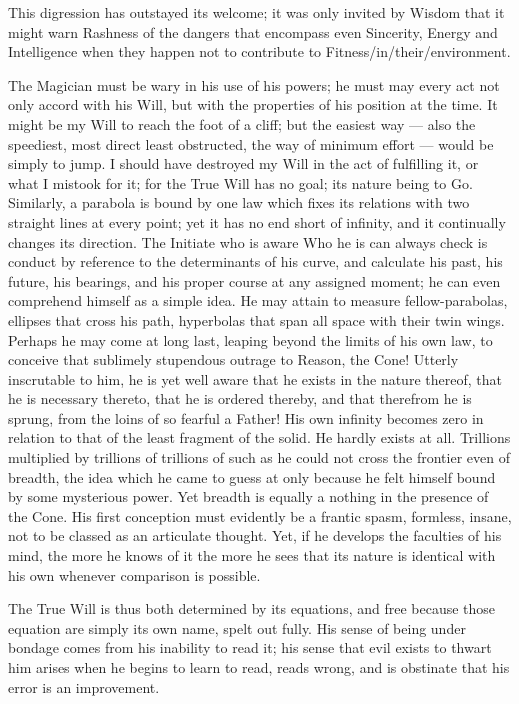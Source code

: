 This digression has outstayed its welcome; it was only invited by Wisdom that it might warn Rashness of the dangers that encompass even Sincerity, Energy and Intelligence when they happen not to contribute to Fitness\-/in\-/their\-/environment.

The Magician must be wary in his use of his powers; he must may every act not only accord with his Will, but with the properties of his position at the time. It might be my Will to reach the foot of a cliff; but the easiest way --- also the speediest, most direct least obstructed, the way of minimum effort --- would be simply to jump. I should have destroyed my Will in the act of fulfilling it, or what I mistook for it; for the True Will has no goal; its nature being to Go. Similarly, a parabola is bound by one law which fixes its relations with two straight lines at every point; yet it has no end short of infinity, and it continually changes its direction. The Initiate who is aware Who he is can always check is conduct by reference to the determinants of his curve, and calculate his past, his future, his bearings, and his proper course at any assigned moment; he can even comprehend himself as a simple idea. He may attain to measure fellow-parabolas, ellipses that cross his path, hyperbolas that span all space with their twin wings. Perhaps he may come at long last, leaping beyond the limits of his own law, to conceive that sublimely stupendous outrage to Reason, the Cone! Utterly inscrutable to him, he is yet well aware that he exists in the nature thereof, that he is necessary thereto, that he is ordered thereby, and that therefrom he is sprung, from the loins of so fearful a Father! His own infinity becomes zero in relation to that of the least fragment of the solid. He hardly exists at all. Trillions multiplied by trillions of trillions of such as he could not cross the frontier even of breadth, the idea which he came to guess at only because he felt himself bound by some mysterious power. Yet breadth is equally a nothing in the presence of the Cone. His first conception must evidently be a frantic spasm, formless, insane, not to be classed as an articulate thought. Yet, if he develops the faculties of his mind, the more he knows of it the more he sees that its nature is identical with his own whenever comparison is possible.

The True Will is thus both determined by its equations, and free because those equation are simply its own name, spelt out fully. His sense of being under bondage comes from his inability to read it; his sense that evil exists to thwart him arises when he begins to learn to read, reads wrong, and is obstinate that his error is an improvement.

